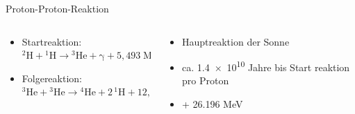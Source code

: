 \documentclass[aspectratio=169,xcolor=dvipsnames,14pt]{beamer}
\begin{document}
    {
    \begin{frame}{Proton-Proton-Reaktion}
        \begin{columns}
            \begin{column}{0.7\textwidth}
                \begin{itemize}
                    \color{LightGrey}
                    \item Startreaktion: \\ \begin{math} {\displaystyle \mathrm {{}^{2}H+{}^{1}H\to {}^{3}He+\gamma +5{,}493\;MeV} }    \end{math}
                    \item Folgereaktion: \\ \begin{math}  {\displaystyle \mathrm {{}^{3}He+{}^{3}He\to {}^{4}He+2\,{}^{1}H+12{,}86\;MeV} }    \end{math}
                    


                \end{itemize}
            \end{column}

            \begin{column}{0.3\textwidth}
                \begin{itemize}
                    \color{LightGrey}
                    \item Hauptreaktion der Sonne
                    \item ca. \num{1.4e10} Jahre bis Start reaktion pro Proton
                    \item + \num{26.196} MeV
                \end{itemize}
            \end{column}
        \end{columns}
        

    \end{frame}
    }
\end{document}
